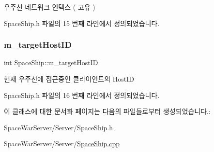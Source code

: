우주선 네트워크 인덱스 ( 고유 ) 



Space\+Ship.\+h 파일의 15 번째 라인에서 정의되었습니다.

\mbox{\label{class_space_ship_a7b8bd199405824c96906094a2e1312c6}} 
\subsubsection{\texorpdfstring{m\+\_\+target\+Host\+ID}{m\_targetHostID}}
{\footnotesize\ttfamily int Space\+Ship\+::m\+\_\+target\+Host\+ID\hspace{0.3cm}{\ttfamily [private]}}



현재 우주선에 접근중인 클라이언트의 Host\+ID 



Space\+Ship.\+h 파일의 16 번째 라인에서 정의되었습니다.



이 클래스에 대한 문서화 페이지는 다음의 파일들로부터 생성되었습니다.\+:\begin{DoxyCompactItemize}
\item 
Space\+War\+Server/\+Server/\hyperlink{_space_ship_8h}{Space\+Ship.\+h}\item 
Space\+War\+Server/\+Server/\hyperlink{_space_ship_8cpp}{Space\+Ship.\+cpp}\end{DoxyCompactItemize}
